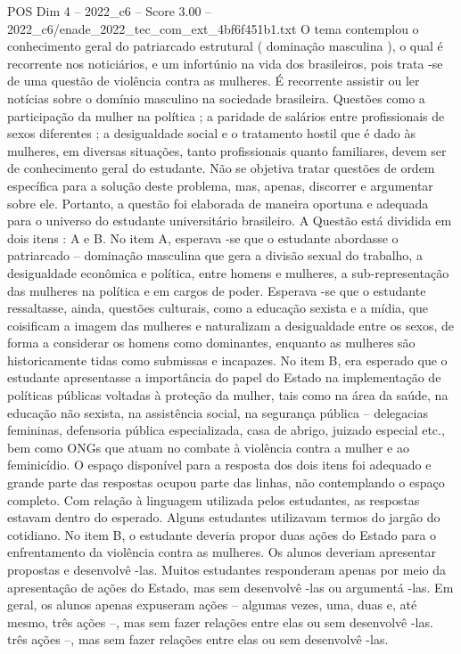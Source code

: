 \begin{textsample}{POS Dim 4 – 2022\_c6 – Score 3.00 – 2022\_c6/enade\_2022\_tec\_com\_ext\_4bf6f451b1.txt}
O tema contemplou o conhecimento geral do patriarcado estrutural ( dominação masculina ), o qual é recorrente nos noticiários, e um infortúnio na vida dos brasileiros, pois trata -se de uma questão de violência contra as mulheres.
É recorrente assistir ou ler notícias sobre o domínio masculino na sociedade brasileira.
Questões como a participação da mulher na política ; a paridade de salários entre profissionais de sexos diferentes ; a desigualdade social e o tratamento hostil que é dado às mulheres, em diversas situações, tanto profissionais quanto familiares, devem ser de conhecimento geral do estudante.
Não se objetiva tratar questões de ordem específica para a solução deste problema, mas, apenas, discorrer e argumentar sobre ele.
Portanto, a questão foi elaborada de maneira oportuna e adequada para o universo do estudante universitário brasileiro.
A Questão está dividida em dois itens : A e B.
No item A, esperava -se que o estudante abordasse o patriarcado – dominação masculina que gera a divisão sexual do trabalho, a desigualdade econômica e política, entre homens e mulheres, a sub-representação das mulheres na política e em cargos de poder.
Esperava -se que o estudante ressaltasse, ainda, questões culturais, como a educação sexista e a mídia, que coisificam a imagem das mulheres e naturalizam a desigualdade entre os sexos, de forma a considerar os homens como dominantes, enquanto as mulheres são historicamente tidas como submissas e incapazes.
No item B, era esperado que o estudante apresentasse a importância do papel do Estado na implementação de políticas públicas voltadas à proteção da mulher, tais como na área da saúde, na educação não sexista, na assistência social, na segurança pública – delegacias femininas, defensoria pública especializada, casa de abrigo, juizado especial etc., bem como ONGs que atuam no combate à violência contra a mulher e ao feminicídio.
O espaço disponível para a resposta dos dois itens foi adequado e grande parte das respostas ocupou parte das linhas, não contemplando o espaço completo.
Com relação à linguagem utilizada pelos estudantes, as respostas estavam dentro do esperado.
Alguns estudantes utilizavam termos do jargão do cotidiano.
No item B, o estudante deveria propor duas ações do Estado para o enfrentamento da violência contra as mulheres.
Os alunos deveriam apresentar propostas e desenvolvê -las.
Muitos estudantes responderam apenas por meio da apresentação de ações do Estado, mas sem desenvolvê -las ou argumentá -las.
Em geral, os alunos apenas expuseram ações – algumas vezes, uma, duas e, até mesmo, três ações –, mas sem fazer relações entre elas ou sem desenvolvê -las. três ações –, mas sem fazer relações entre elas ou sem desenvolvê -las.

\end{textsample}
